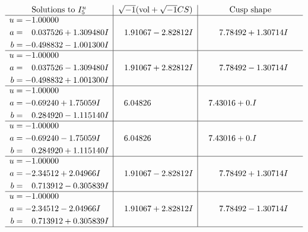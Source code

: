 \documentclass[1p]{elsarticle_modified}
\theoremstyle{definition}
\newcommand{\I}{\sqrt{-1}}
\begin{document}
$$\begin{array}{c|c|c}  
\text{Solutions to }I^u_{5}& \I (\text{vol} + \sqrt{-1}CS) & \text{Cusp shape}\\
 \hline 
\begin{aligned}
u &= -1.00000\phantom{ +0.000000I} \\
a &= \phantom{-}0.037526 + 1.309480 I \\
b &= -0.498832 - 1.001300 I\end{aligned}
 & \phantom{-}1.91067 - 2.82812 I & \phantom{-}7.78492 + 1.30714 I \\ \hline\begin{aligned}
u &= -1.00000\phantom{ +0.000000I} \\
a &= \phantom{-}0.037526 - 1.309480 I \\
b &= -0.498832 + 1.001300 I\end{aligned}
 & \phantom{-}1.91067 + 2.82812 I & \phantom{-}7.78492 - 1.30714 I \\ \hline\begin{aligned}
u &= -1.00000\phantom{ +0.000000I} \\
a &= -0.69240 + 1.75059 I \\
b &= \phantom{-}0.284920 - 1.115140 I\end{aligned}
 & \phantom{-}6.04826\phantom{ +0.000000I} & \phantom{-}7.43016 + 0. I\phantom{ +0.000000I} \\ \hline\begin{aligned}
u &= -1.00000\phantom{ +0.000000I} \\
a &= -0.69240 - 1.75059 I \\
b &= \phantom{-}0.284920 + 1.115140 I\end{aligned}
 & \phantom{-}6.04826\phantom{ +0.000000I} & \phantom{-}7.43016 + 0. I\phantom{ +0.000000I} \\ \hline\begin{aligned}
u &= -1.00000\phantom{ +0.000000I} \\
a &= -2.34512 + 2.04966 I \\
b &= \phantom{-}0.713912 - 0.305839 I\end{aligned}
 & \phantom{-}1.91067 - 2.82812 I & \phantom{-}7.78492 + 1.30714 I \\ \hline\begin{aligned}
u &= -1.00000\phantom{ +0.000000I} \\
a &= -2.34512 - 2.04966 I \\
b &= \phantom{-}0.713912 + 0.305839 I\end{aligned}
 & \phantom{-}1.91067 + 2.82812 I & \phantom{-}7.78492 - 1.30714 I\\
 \hline 
 \end{array}$$\newpage\newpage\renewcommand{\arraystretch}{1}
\end{document}
